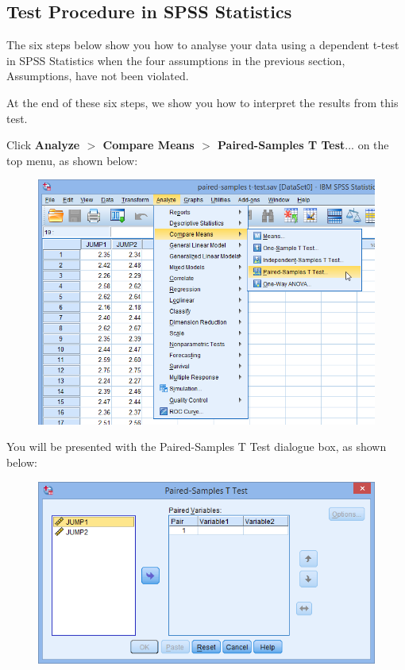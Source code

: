 \documentclass[]{article}
\begin{document}
\newpage	
\subsection{Test Procedure in SPSS Statistics}
	The six steps below show you how to analyse your data using a dependent t-test in SPSS Statistics when the four assumptions in the previous section, Assumptions, have not been violated. 
	
	At the end of these six steps, we show you how to interpret the results from this test. 

	
	
\noindent Click \textbf{Analyze $>$ Compare Means $>$ Paired-Samples T Test}... on the top menu, as shown below:
	
\begin{figure}[h!]
\centering
\includegraphics[width=0.5\linewidth]{Paired/pairedMenu1}

\label{fig:pairedMenu1}
\end{figure}

	You will be presented with the Paired-Samples T Test dialogue box, as shown below:
	
\begin{figure}[h!]
	\centering
	\includegraphics[width=0.5\linewidth]{Paired/pairedMenu2}

	\label{fig:pairedMenu2}
\end{figure}
\end{document}
